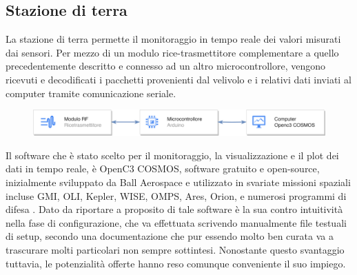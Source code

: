 \documentclass[12pt]{article}
\begin{document}
\subsection{Stazione di terra}
La stazione di terra permette il monitoraggio in tempo reale dei valori misurati dai sensori. Per mezzo di un modulo rice-trasmettitore complementare a quello precedentemente descritto e connesso ad un altro microcontrollore, vengono ricevuti e decodificati i pacchetti provenienti dal velivolo e i relativi dati inviati al computer tramite comunicazione seriale. 

\begin{figure}[h]
	\centering
	\includegraphics[width=13cm]{img/GS-Arch}
\end{figure}

\noindent 
Il software che è stato scelto per il monitoraggio, la visualizzazione e il plot dei dati in tempo reale, è OpenC3 COSMOS, software gratuito e open-source, inizialmente sviluppato da Ball Aerospace e utilizzato in svariate missioni spaziali incluse GMI, OLI, Kepler, WISE, OMPS, Ares, Orion, e numerosi programmi di difesa \cite{cosmos}. Dato da riportare a proposito di tale software è la sua contro intuitività nella fase di configurazione, che va effettuata scrivendo manualmente file testuali di setup, secondo una documentazione che pur essendo molto ben curata va a trascurare molti particolari non sempre sottintesi. Nonostante questo svantaggio tuttavia, le potenzialità offerte hanno reso comunque conveniente il suo impiego.
\end{document}
